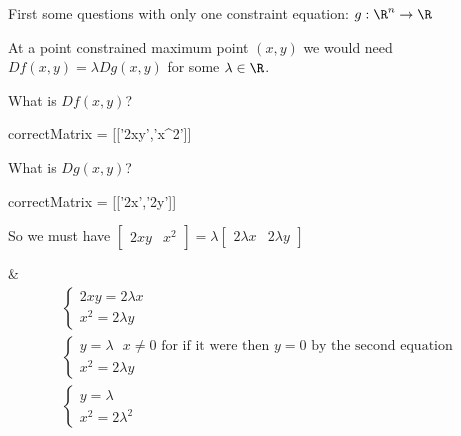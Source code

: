 \documentclass{ximera}
\begin{document}
	First some questions with only one constraint equation:  $g:\R^n \to \R$
	
	\begin{question}
		\begin{solution}
		\begin{hint}
			At a point constrained maximum point $(x,y)$ we would need $Df(x,y) = \lambda Dg(x,y)$ for some $\lambda \in \R$.
		\end{hint}
		\begin{hint}
			\begin{question}
			\begin{solution}
				What is $Df(x,y)$?
					\begin{matrix-answer}
						correctMatrix = [['2xy','x^2']]
					\end{matrix-answer}
			\end{solution}
			\begin{solution}
				What is $Dg(x,y)$?
					\begin{matrix-answer}
						correctMatrix = [['2x','2y']]
					\end{matrix-answer}
			\end{solution}
			\end{question}
		\end{hint}
		\begin{hint}
			So we must have \(\begin{bmatrix} 2xy & x^2\end{bmatrix} = \lambda \begin{bmatrix} 2\lambda x & 2\lambda y\end{bmatrix}\)
		\end{hint}
		\begin{hint}
			&\begin{align*}
				\begin{cases}
				2xy = 2\lambda x\\
				x^2 =  2\lambda y
				\end{cases}\\
				\begin{cases}
				y = \lambda \text{  $x \neq 0$ for if it were then $y=0$ by the second equation}\\
				x^2 =  2\lambda y
				\end{cases}\\
				\begin{cases}
				y = \lambda\\
				x^2 =  2\lambda^2
				\end{cases}
			\end{align*}

\end{hint}
\end{solution}
\end{question}
\end{document}
